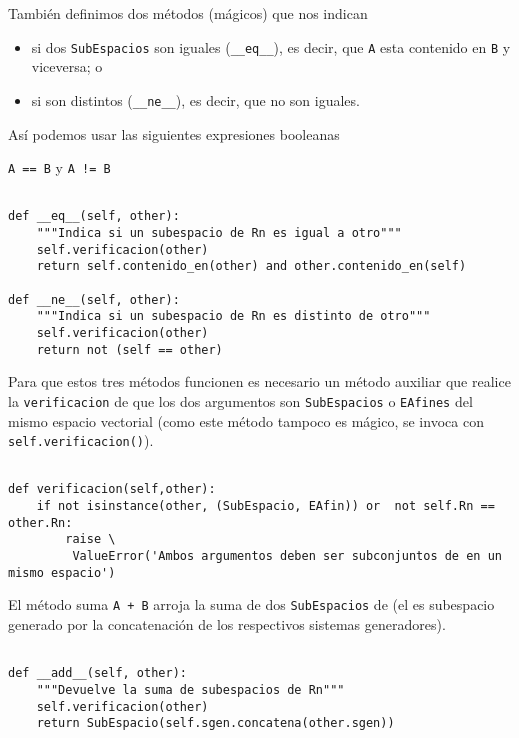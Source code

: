 \documentclass[11pt]{report}
\begin{document}
También definimos dos métodos (mágicos) que nos indican
\begin{itemize}
\item si dos \texttt{SubEspacios} son iguales (\texttt{\_\_eq\_\_}), es decir, que \texttt{A} esta
contenido en \texttt{B} y viceversa; o
\item si son distintos (\texttt{\_\_ne\_\_}), es decir, que no son iguales.
\end{itemize}

Así podemos usar las siguientes expresiones booleanas
\begin{center}
\Verb/A == B/
\quad y \quad
\Verb/A != B/
\end{center}

\begin{verbatim}

def __eq__(self, other):
    """Indica si un subespacio de Rn es igual a otro"""
    self.verificacion(other)
    return self.contenido_en(other) and other.contenido_en(self)

def __ne__(self, other):
    """Indica si un subespacio de Rn es distinto de otro"""
    self.verificacion(other)
    return not (self == other)

\end{verbatim}

Para que estos tres métodos funcionen es necesario un método auxiliar
que realice la \texttt{verificacion} de que los dos argumentos son
\texttt{SubEspacios} o \texttt{EAfines} del mismo espacio vectorial \R[m] (como este
método tampoco es mágico, se invoca con \texttt{self.verificacion()}).

\begin{verbatim}

def verificacion(self,other):
    if not isinstance(other, (SubEspacio, EAfin)) or  not self.Rn == other.Rn: 
        raise \
         ValueError('Ambos argumentos deben ser subconjuntos de en un mismo espacio')

\end{verbatim}

El método suma \texttt{A + B} arroja la suma de dos \texttt{SubEspacios} de \R[m]
(el es subespacio generado por la concatenación de los respectivos
sistemas generadores).

\begin{verbatim}

def __add__(self, other):
    """Devuelve la suma de subespacios de Rn"""
    self.verificacion(other)
    return SubEspacio(self.sgen.concatena(other.sgen))

\end{verbatim}
\end{document}
